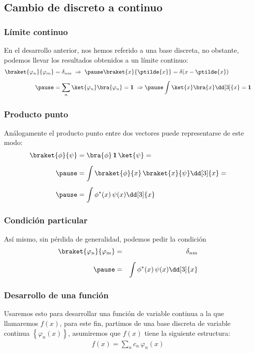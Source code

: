 \subsection{Cambio de discreto a continuo}
\begin{frame}
\frametitle{Límite continuo}
En el desarrollo anterior, nos hemos referido a una base discreta, no obstante, podemos llevar los resultados obtenidos a un límite continuo:
\fontsize{12}{12}\selectfont
\begin{eqnarray}
\begin{aligned}[b]
\braket{\varphi_{n}}{\varphi_{m}} &= \delta_{nm} \hspace{0.1cm} \Rightarrow \hspace{0.1cm} \pause \braket{x}{\ptilde{x}} = \delta(x - \ptilde{x}) \\[0.5em] \pause
&= \sum_{n} \ket{\varphi_{n}} \bra{\varphi_{n}} = \mathbf{1} \hspace{0.1cm} \Rightarrow \hspace{0.cm} \pause \int \ket{x} \bra{x} \dd[3]{x} = \mathbf{1}
\end{aligned}
\label{eq:ecuacion_14}
\end{eqnarray}
\end{frame}
\begin{frame}
\frametitle{Producto punto}
Análogamente el producto punto entre dos vectores puede representarse de este modo:
\begin{eqnarray}
\begin{aligned}[b]
\braket{\phi}{\psi} &= \bra{\phi} \, \mathbf{1} \, \ket{\psi} = \\[0.5em] \pause
&= \int \braket{\phi}{x} \, \braket{x}{\psi} \dd[3]{x} = \\[0.5em] \pause
&= \int \phi^{*}(x) \, \psi (x) \dd[3]{x}
\end{aligned}
\label{eq:ecuacion_15}
\end{eqnarray}
\end{frame}
\begin{frame}
\frametitle{Condición particular}
Así mismo, sin pérdida de generalidad, podemos pedir la condición
\begin{eqnarray*}
\braket{\varphi_{n}}{\varphi_{m}} &=& \delta_{nm} \\[0.5em] \pause
&=& \int \phi^{*}(x) \, \psi (x) \dd[3]{x}
\end{eqnarray*}
\end{frame}
\begin{frame}
\frametitle{Desarrollo de una función}
Usaremos esto para desarrollar una función de variable continua a la que llamaremos $f(x)$, para este fin, partimos de una base discreta de variable continua $\left\{ \varphi_{n}(x) \right\}$, asumiremos que $f(x)$ tiene la siguiente estructura:
\begin{align}
f(x) = \sum_{n} c_{n} \, \varphi_{n}(x)
\label{eq:ecuacion_16}
\end{align}
\end{frame}
